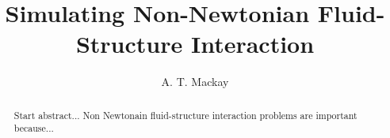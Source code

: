 \documentclass{article}
\title{Simulating Non-Newtonian Fluid-Structure Interaction}
\author{A. T. Mackay}
\date{}
\numberwithin{equation}{section}
\begin{document}
	\maketitle

\begin{abstract}
	Start abstract... Non Newtonain fluid-structure interaction problems are important because...
\end{abstract}	
\end{document}
